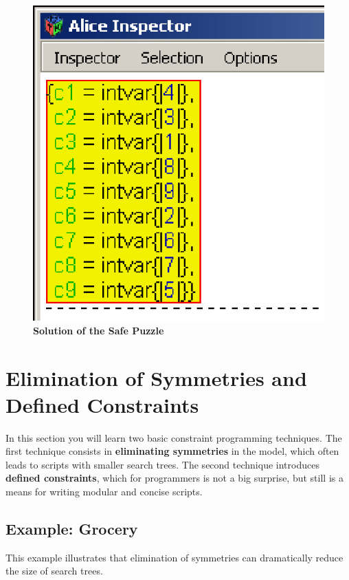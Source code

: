 \documentclass[a4paper]{scrartcl}
\begin{document}
\begin{figure}[htpb]
\centerline{\includegraphics*[scale=1.0]{figs/solution_safe2.eps}}
\caption{{\bf Solution of the Safe Puzzle}}
\label{figure10}
\end{figure}



\newpage
\section{Elimination of Symmetries and Defined Constraints}
In this section you will learn two basic constraint programming techniques. 
The first technique consists in {\bf eliminating symmetries} in the model, 
which often leads to scripts with smaller search trees. The second technique 
introduces {\bf defined constraints}, which for programmers is not a big
surprise, but still is a means for writing modular and concise scripts.

\subsection{Example: Grocery}
This example illustrates that elimination of symmetries can 
dramatically reduce 
the size of search trees.
\end{document}
